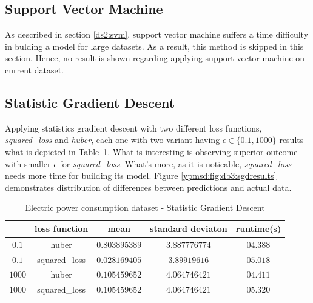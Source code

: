 \subsection{Support Vector Machine}

As described in section \ref{ds2:svm}, support vector machine suffers a time
difficulty in bulding a model for large datasets. As a result, this method is skipped in
this section. Hence, no result is shown regarding applying support vector
machine on current dataset.

\subsection{Statistic Gradient Descent}

Applying statistics gradient descent with two different loss functions, {\it
squared\_loss} and {\it huber}, each one with two variant having $\epsilon \in
\{0.1, 1000\}$ results what is depicted in
Table~\ref{ypmsd:table:ds3sgdresults}. What is interesting is observing superior
outcome with smaller $\epsilon$ for {\it squared\_loss}. What's more, as it is
noticable, {\it squared\_loss} needs more time for building its model. Figure \ref{ypmsd:fig:db3:sgdresults} demonstrates distribution of differences between
predictions and actual data.



\begin{table}[p]
	\begin{center}
		\begin{tabular}{|c|c|c|c|c|}
			\hline	\backslashbox{$\epsilon$}{}&loss function&mean&standard
			deviaton&runtime(s)\\
\hline$0.1$&huber&$0.803895389$&$3.887776774$&$04.388$\\
\hline$0.1$&squared\_loss&$0.028169405$&$3.89919616$&$05.018$\\
\hline$1000$&huber&$0.105459652$&$4.064746421$&$04.411$\\
\hline$1000$&squared\_loss&$0.105459652$&$4.064746421$&$05.320$\\\hline
\end{tabular}
\end{center}
\caption{Electric power consumption dataset - Statistic Gradient Descent}
\label{ypmsd:table:ds3sgdresults}
\end{table}

